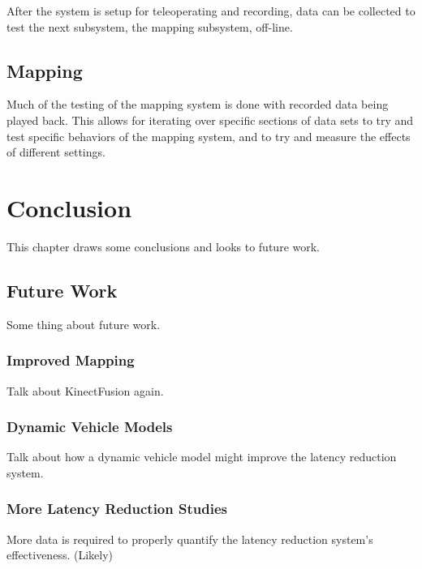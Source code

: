 \documentclass[12pt]{report}
\begin{document}
After the system is setup for teleoperating and recording, data can be collected to test the next subsystem, the mapping subsystem, off-line.

\section{Mapping}
Much of the testing of the mapping system is done with recorded data being played back.  This allows for iterating over specific sections of data sets to try and test specific behaviors of the mapping system, and to try and measure the effects of different settings.


\chapter{Conclusion}\label{chap:conclusion}
This chapter draws some conclusions and looks to future work.

\section{Future Work}
Some thing about future work.

\subsection{Improved Mapping}
Talk about KinectFusion again.

\subsection{Dynamic Vehicle Models}
Talk about how a dynamic vehicle model might improve the latency reduction system.

\subsection{More Latency Reduction Studies}
More data is required to properly quantify the latency reduction system's effectiveness.  (Likely)


\end{document}
